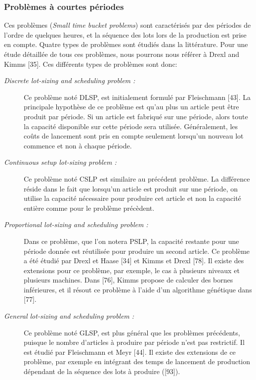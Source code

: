\documentclass[12pt,a4paper]{article}
\begin{document}
	\subsubsection{Problèmes à courtes périodes}
	Ces problèmes (\emph{Small time bucket problems}) sont caractérisés par des périodes de l'ordre de quelques heures, et la séquence des lots lors de la production est prise en compte. Quatre types de problèmes sont étudiés dans la littérature. Pour une étude détaillée de tous ces problèmes, nous pourrons nous référer à Drexl and Kimms [35]. Ces différents types de problèmes sont donc:
	\begin{description}
		\item[\textsl{Discrete lot-sizing and scheduling problem :}]
		Ce problème noté DLSP, est initialement formulé par Fleischmann [43]. La principale hypothèse de ce problème est qu'au plus un article peut être produit par
période. Si un article est fabriqué sur une période, alors toute la capacité disponible sur cette période sera utilisée. Généralement, les coûts de lancement sont pris en compte seulement lorsqu'un nouveau lot commence et non à chaque période.
		\item[\textsl{Continuous setup lot-sizing problem :}]
		Ce problème noté CSLP est similaire au précédent problème. La différence réside dans le fait que lorsqu'un article est produit sur une période, on utilise la capacité nécessaire pour produire cet article et non la capacité entière comme pour le problème précèdent.
		\item[\textsl{Proportional lot-sizing and scheduling problem : }] 
		Dans ce problème, que l'on notera PSLP, la capacité restante pour une période donnée est réutilisée pour produire un second article. Ce problème a été étudié par Drexl et Haase [34] et Kimms et Drexl [78]. Il existe des extensions pour ce problème, par exemple, le cas à plusieurs niveaux et plusieurs machines. Dans [76], Kimms propose de calculer des bornes inférieures, et il résout ce problème à l'aide d'un algorithme génétique dans [77].
		\item[\textsl{General lot-sizing and scheduling problem : }] 
		Ce problème noté GLSP, est plus général que les problèmes précédents, puisque le nombre d'articles à produire par période n'est pas restrictif. Il est étudié par Fleischmann et Meyr [44]. Il existe des extensions de ce problème, par exemple en intégrant des temps de lancement de production dépendant de la séquence des lots à produire ([93]).
	\end{description}
	
\end{document}
